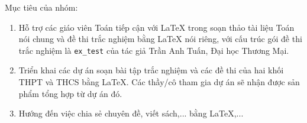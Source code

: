 \documentclass[12pt,a4paper,oneside]{book}
\begin{document}
\vspace{0.6cm}

\noindent Mục tiêu của nhóm: 
\begin{enumerate}
\item Hỗ trợ các giáo viên Toán tiếp cận với \LaTeX{} trong soạn thảo tài liệu Toán nói chung và đề thi trắc nghiệm bằng \LaTeX{} nói riêng, với cấu trúc gói đề thi trắc nghiệm là \texttt{ex\_test} của tác giả Trần Anh Tuấn, Đại học Thương Mại.
\item Triển khai các dự án soạn bài tập trắc nghiệm và các đề thi của hai khối THPT và THCS bằng \LaTeX{}. Các thầy/cô tham gia dự án sẽ nhận được sản phẩm tổng hợp từ dự án đó.
\item Hướng đến việc chia sẻ chuyên đề, viết sách,... bằng \LaTeX,...
\end{enumerate}


























\end{document}

